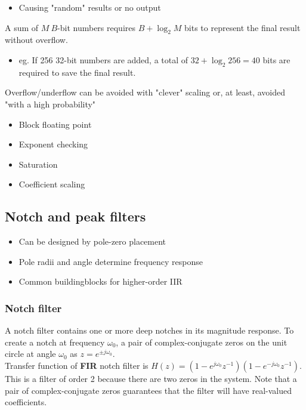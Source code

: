 \begin{itemize}
	\item Causing "random" results or no output
\end{itemize}

A sum of $M \: B$-bit numbers requires $B + \log_2 M$ bits to represent the final result without overflow.
\begin{itemize}
	\item eg. If 256 32-bit numbers	are added, a total of $32 + \log_2 256 =40$ bits are required to save the final result.
\end{itemize}

Overflow/underflow can be avoided with "clever" scaling or, at least, avoided "with a high probability"
\begin{itemize}
	\item Block floating point
	\item Exponent checking
	\item Saturation
	\item Coefficient scaling
\end{itemize}

\subsection{Notch and peak filters}
\begin{itemize}
	\item Can be designed by pole-zero placement
	\item Pole radii and angle determine frequency response
	\item Common buildingblocks	for higher-order IIR
\end{itemize}

\subsubsection{Notch filter}
A notch filter contains one or more deep notches in its magnitude response. To create a notch at frequency $\omega_0$, a pair of complex-conjugate zeros on
the unit circle at angle $\omega_0$ as $z=e^{\pm j\omega_0}$.\\

\noindent Transfer function of \textbf{FIR} notch filter is  $H(z) = (1-e^{j\omega_0} z^{-1})(1-e^{-j\omega_0} z^{-1})$. This is a filter of order 2 because there are two zeros in the system. Note that a pair of complex-conjugate zeros guarantees that the filter will have real-valued coefficients.\\


